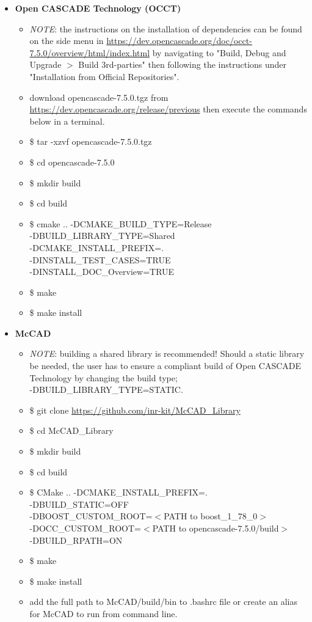 \documentclass[12pt, a4paper, titlepage]{article}
\begin{document}
\begin{itemize}
      \item \textbf{Open CASCADE Technology (OCCT)}
      \begin{itemize}
        \item \emph{NOTE}: the instructions on the installation of dependencies can be found on the side menu in \url{https://dev.opencascade.org/doc/occt-7.5.0/overview/html/index.html} by navigating to "Build, Debug and Upgrade $>$ Build 3rd-parties" then following the instructions under "Installation from Official Repositories".
    	\item download opencascade-7.5.0.tgz from \url{https://dev.opencascade.org/release/previous} then execute the commands below in a terminal.
    	\item \$ tar -xzvf opencascade-7.5.0.tgz
    	\item \$ cd opencascade-7.5.0
    	\item \$ mkdir build
    	\item \$ cd build
    	\item \$ cmake .. -DCMAKE\_BUILD\_TYPE=Release \\-DBUILD\_LIBRARY\_TYPE=Shared \\-DCMAKE\_INSTALL\_PREFIX=. \\-DINSTALL\_TEST\_CASES=TRUE \\-DINSTALL\_DOC\_Overview=TRUE
    	\item \$ make
    	\item \$ make install
      \end{itemize}
	  \item \textbf{McCAD}
	  \begin{itemize}
		\item \emph{NOTE}: building a shared library is recommended! Should a static library be needed, the user has to ensure a compliant build of Open CASCADE Technology by changing the build type; \\ -DBUILD\_LIBRARY\_TYPE=STATIC.
		\item \$ git clone \url{https://github.com/inr-kit/McCAD_Library}
		\item \$ cd McCAD\_Library
		\item \$ mkdir build
		\item \$ cd build
		\item \$ CMake .. -DCMAKE\_INSTALL\_PREFIX=. \\-DBUILD\_STATIC=OFF \\-DBOOST\_CUSTOM\_ROOT=$<$PATH to boost\_1\_78\_0$>$ \\-DOCC\_CUSTOM\_ROOT=$<$PATH to opencascade-7.5.0/build$>$ \\-DBUILD\_RPATH=ON
		\item \$ make
		\item \$ make install
		\item add the full path to McCAD/build/bin to .bashrc file or create an alias for McCAD to run from command line.
	  \end{itemize}
    \end{itemize}
\end{document}
